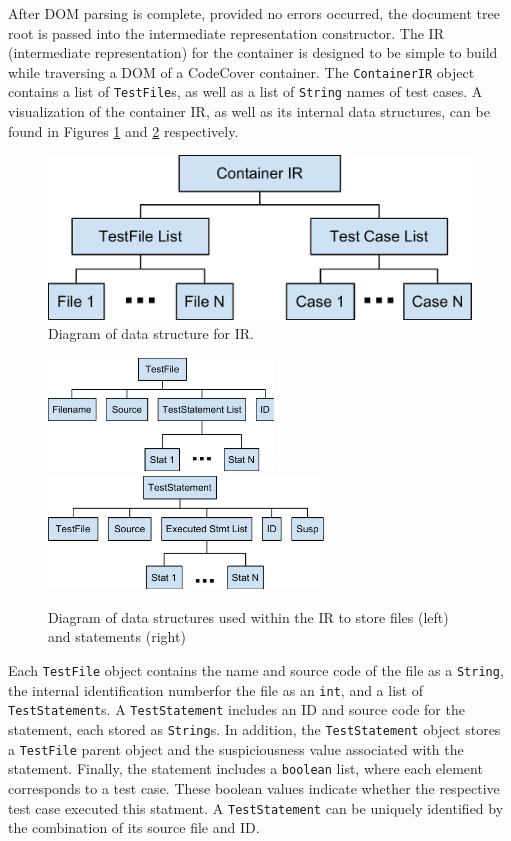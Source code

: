 After DOM parsing is complete, provided no errors occurred, the document tree root is
passed into the intermediate representation constructor.  The IR (intermediate representation)
for the container is designed to be simple to build while traversing a DOM of a CodeCover
container.  The \texttt{ContainerIR} object contains a list of \texttt{TestFile}s, as well
as a list of \texttt{String} names of test cases.  A visualization of the container IR, as
well as its internal data structures, can be found in Figures \ref{fig:ir} and \ref{fig:ir2}
respectively.  

\begin{figure}[tb]
\centering
\includegraphics[width=0.6\linewidth]{img/ContainerIR.pdf}
\caption{Diagram of data structure for IR.}
\label{fig:ir}
\end{figure}

\begin{figure}[tb]
\centering
\includegraphics[height=30mm]{img/TestFile.pdf}
\hspace{0.1\linewidth}
\includegraphics[height=30mm]{img/TestStatement.pdf}
\caption{Diagram of data structures used within the IR to store files (left) and 
statements (right)}
\label{fig:ir2}
\end{figure}

Each \texttt{TestFile} object contains the name and source code of the file as a \texttt{String}, the internal identification numberfor the file as an \texttt{int}, and a list of \texttt{TestStatement}s.  
A \texttt{TestStatement} includes an ID and source code for the statement, each stored as \texttt{String}s.  In addition, the \texttt{TestStatement} object stores a \texttt{TestFile} 
parent object and the suspiciousness value associated with the statement.  Finally, the statement 
includes a \texttt{boolean} list, where each element corresponds to a test case.  These boolean 
values indicate whether the respective test case executed this statment.  A \texttt{TestStatement} 
can be uniquely identified by the combination of its source file and ID.

